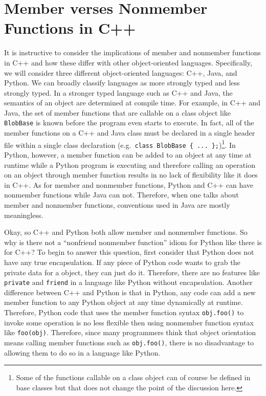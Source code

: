 \documentclass[pdf,ps2pdf,11pt]{SANDreport}
\begin{document}
%
\section{Member verses Nonmember Functions in C++}
%

It is instructive to consider the implications of member and nonmember
functions in C++ and how these differ with other object-oriented languages.
Specifically, we will consider three different object-oriented languages: C++,
Java, and Python.  We can broadly classify languages as more strongly typed
and less strongly typed.  In a stronger typed language such as C++ and Java,
the semantics of an object are determined at compile time.  For example, in
C++ and Java, the set of member functions that are callable on a class object
like {}\texttt{BlobBase} is known before the program even starts to execute.
In fact, all of the member functions on a C++ and Java class must be declared
in a single header file within a single class declaration (e.g.\
{}\texttt{class BlobBase \{ ... \};})\footnote{Some of the functions callable
on a class object can of course be defined in base classes but that does not
change the point of the discussion here.}.  In Python, however, a member
function can be added to an object at any time at runtime while a Python
program is executing and therefore calling an operation on an object through
member function results in no lack of flexibility like it does in C++.  As for
member and nonmember functions, Python and C++ can have nonmember functions
while Java can not.  Therefore, when one talks about member and nonmember
functions, conventions used in Java are mostly meaningless.

Okay, so C++ and Python both allow member and nonmember functions. So why is
there not a ``nonfriend nonmember function'' idiom for Python like there is
for C++?  To begin to answer this question, first consider that Python does
not have any true encapsulation.  If any piece of Python code wants to grab
the private data for a object, they can just do it.  Therefore, there are no
features like {}\texttt{private} and {}\texttt{friend} in a language like
Python without encapsulation.  Another difference between C++ and Python is
that in Python, any code can add a new member function to any Python object at
any time dynamically at runtime.  Therefore, Python code that uses the member
function syntax {}\texttt{obj.foo()} to invoke some operation is no less
flexible then using nonmember function syntax like {}\texttt{foo(obj)}.
Therefore, since many programmers think that object orientation means calling
member functions such as {}\texttt{obj.foo()}, there is no disadvantage to
allowing them to do so in a language like Python.
\end{document}
